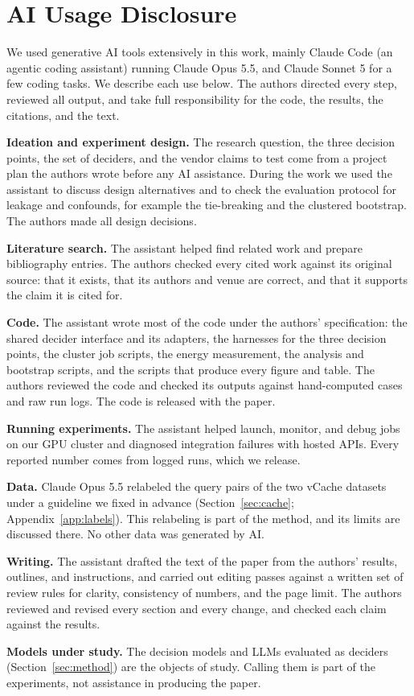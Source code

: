 \section*{AI Usage Disclosure}

We used generative AI tools extensively in this work, mainly Claude Code (an agentic coding assistant) running Claude Opus 5.5, and Claude Sonnet 5 for a few coding tasks.
We describe each use below.
The authors directed every step, reviewed all output, and take full responsibility for the code, the results, the citations, and the text.

\textbf{Ideation and experiment design.}
The research question, the three decision points, the set of deciders, and the vendor claims to test come from a project plan the authors wrote before any AI assistance.
During the work we used the assistant to discuss design alternatives and to check the evaluation protocol for leakage and confounds, for example the tie-breaking and the clustered bootstrap.
The authors made all design decisions.

\textbf{Literature search.}
The assistant helped find related work and prepare bibliography entries.
The authors checked every cited work against its original source: that it exists, that its authors and venue are correct, and that it supports the claim it is cited for.

\textbf{Code.}
The assistant wrote most of the code under the authors' specification: the shared decider interface and its adapters, the harnesses for the three decision points, the cluster job scripts, the energy measurement, the analysis and bootstrap scripts, and the scripts that produce every figure and table.
The authors reviewed the code and checked its outputs against hand-computed cases and raw run logs.
The code is released with the paper.

\textbf{Running experiments.}
The assistant helped launch, monitor, and debug jobs on our GPU cluster and diagnosed integration failures with hosted APIs.
Every reported number comes from logged runs, which we release.

\textbf{Data.}
Claude Opus 5.5 relabeled the query pairs of the two vCache datasets under a guideline we fixed in advance (Section~\ref{sec:cache}; Appendix~\ref*{app:labels}).
This relabeling is part of the method, and its limits are discussed there.
No other data was generated by AI.

\textbf{Writing.}
The assistant drafted the text of the paper from the authors' results, outlines, and instructions, and carried out editing passes against a written set of review rules for clarity, consistency of numbers, and the page limit.
The authors reviewed and revised every section and every change, and checked each claim against the results.

\textbf{Models under study.}
The decision models and LLMs evaluated as deciders (Section~\ref{sec:method}) are the objects of study.
Calling them is part of the experiments, not assistance in producing the paper.

